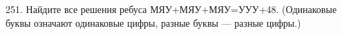 251. Найдите все решения ребуса МЯУ+МЯУ+МЯУ=УУУ+48. (Одинаковые буквы означают одинаковые цифры, разные буквы --- разные цифры.)\\
